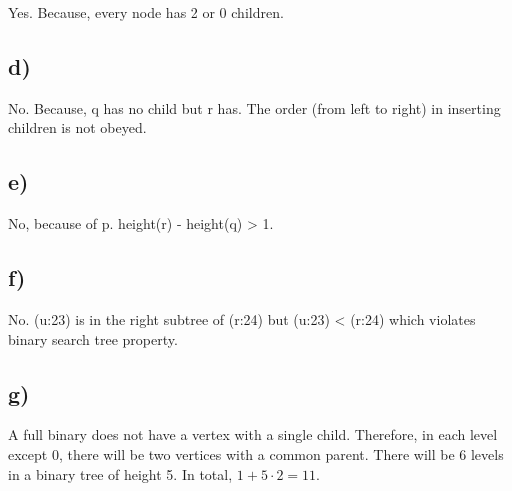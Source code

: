 \documentclass[11pt]{article}
\begin{document}
	Yes. Because, every node has 2 or 0 children.

\subsection*{d)}

	No. Because, q has no child but r has. The order (from left to right) in inserting children is not obeyed.

\subsection*{e)}

	No, because of p. height(r) - height(q) > 1.

\subsection*{f)}

	No. (u:23) is in the right subtree of (r:24) but (u:23) < (r:24) which violates binary search tree property.

\subsection*{g)}

	A full binary does not have a vertex with a single child. Therefore, in each level except 0, there will be two vertices with a common parent. 
	There will be 6 levels in a binary tree of height 5. In total, $ 1 + 5 \cdot 2 = 11 $.
\end{document}
